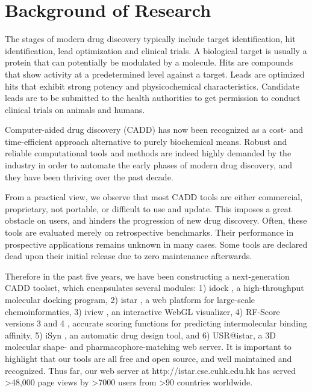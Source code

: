 \documentclass[a4paper,12pt]{article}
\begin{document}
\section*{Background of Research}

The stages of modern drug discovery typically include target identification, hit identification, lead optimization and clinical trials. A biological target is usually a protein that can potentially be modulated by a molecule. Hits are compounds that show activity at a predetermined level against a target. Leads are optimized hits that exhibit strong potency and physicochemical characteristics. Candidate leads are to be submitted to the health authorities to get permission to conduct clinical trials on animals and humans.

Computer-aided drug discovery (CADD) has now been recognized as a cost- and time-efficient approach alternative to purely biochemical means. Robust and reliable computational tools and methods are indeed highly demanded by the industry in order to automate the early phases of modern drug discovery, and they have been thriving over the past decade.

From a practical view, we observe that most CADD tools are either commercial, proprietary, not portable, or difficult to use and update. This imposes a great obstacle on users, and hinders the progression of new drug discovery. Often, these tools are evaluated merely on retrospective benchmarks. Their performance in prospective applications remains unknown in many cases. Some tools are declared dead upon their initial release due to zero maintenance afterwards.

Therefore in the past five years, we have been constructing a next-generation CADD toolset, which encapsulates several modules: 1) idock \cite{1153}, a high-throughput molecular docking program, 2) istar \cite{1362}, a web platform for large-scale chemoinformatics, 3) iview \cite{1366,1265}, an interactive WebGL visualizer, 4) RF-Score versions 3 and 4 \cite{1432,1647,1434,1663}, accurate scoring functions for predicting intermolecular binding affinity, 5) iSyn \cite{1409,1387}, an automatic drug design tool, and 6) USR@istar, a 3D molecular shape- and pharmacophore-matching web server. It is important to highlight that our tools are all free and open source, and well maintained and recognized. Thus far, our web server at http://istar.cse.cuhk.edu.hk has served \textgreater48,000 page views by \textgreater7000 users from \textgreater90 countries worldwide.
\end{document}
